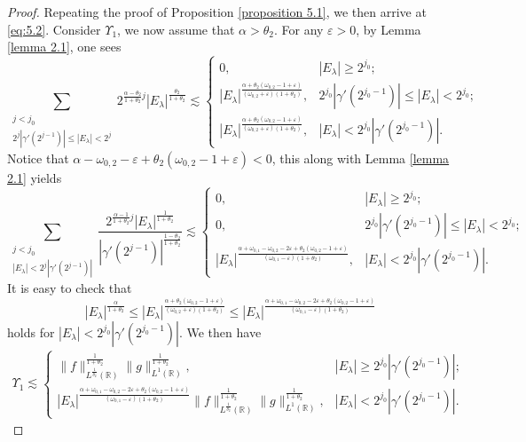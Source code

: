 \documentclass[11pt, twoside, leqno]{article}
\theoremstyle{definition}
\numberwithin{equation}{section}
\begin{document}
\begin{proof}

Repeating the proof of Proposition \ref{proposition 5.1}, we then arrive at \eqref{eq:5.2}. Consider $\Upsilon_{1}$, we now assume that $\alpha>\theta_2$. For any $\varepsilon>0$, by Lemma \ref{lemma 2.1}, one sees
$$\sum\limits_{  \substack{j<j_{0}   \\ 2^j{|\gamma'(2^{j-1})|}\leq|E_{\lambda}|<2^j }} 2^{{\frac{\alpha-\theta_{2}}{1+\theta_{2}}}j}|E_\lambda|^{\frac{\theta_{2}}{1+\theta_{2}}}\lesssim
\begin{cases}
  0, & |E_\lambda|\geq2^{j_0}; \\
  |E_\lambda|^{\frac{\alpha+\theta_2(\omega_{0,2}-1+\varepsilon)}{(\omega_{0,2}+\varepsilon)(1+\theta_{2})}}, & 2^{j_0}|\gamma'(2^{j_{0}-1})|\leq|E_{\lambda}|<2^{j_0};\\
  |E_\lambda|^{\frac{\alpha+\theta_2(\omega_{0,2}-1+\varepsilon)}{(\omega_{0,2}+\varepsilon)(1+\theta_{2})}}, &|E_{\lambda}|<2^{j_0}|\gamma'(2^{j_{0}-1})|.
\end{cases}$$
Notice that $\alpha-\omega_{0,2}-\varepsilon+\theta_2(\omega_{0,2}-1+\varepsilon)<0$, this along with Lemma \ref{lemma 2.1} yields
$$\sum\limits_{  \substack{j<j_{0}   \\ |E_{\lambda}|<2^j|\gamma'(2^{j-1})| }} \frac{2^{{\frac{\alpha-1}{1+\theta_{2}}j}}|E_\lambda|^{\frac{1}{1+\theta_{2}}}}{|\gamma'(2^{j-1})|^{\frac{1-\theta_{2}}{1+\theta_{2}}}}\lesssim
\begin{cases}
  0, & |E_\lambda|\geq2^{j_0}; \\
  0, & 2^{j_0}|\gamma'(2^{j_{0}-1})|\leq|E_{\lambda}|<2^{j_0};\\
  |E_\lambda|^{\frac{\alpha+\omega_{0,1}-\omega_{0,2}-2\varepsilon+\theta_{2}(\omega_{0,2}-1+\varepsilon)}{(\omega_{0,1}-\varepsilon)(1+\theta_{2})}}, &|E_{\lambda}|<2^{j_0}|\gamma'(2^{j_{0}-1})|.
\end{cases}$$
It is easy to check that $$|E_\lambda|^{{\frac{\alpha}{1+\theta_{2}}}}\leq|E_\lambda|^{\frac{\alpha+\theta_2(\omega_{0,2}-1+\varepsilon)}{(\omega_{0,2}+\varepsilon)(1+\theta_{2})}}\leq
|E_\lambda|^{\frac{\alpha+\omega_{0,1}-\omega_{0,2}-2\varepsilon+\theta_{2}(\omega_{0,2}-1+\varepsilon)}{(\omega_{0,1}-\varepsilon)(1+\theta_{2})}}$$
holds for $|E_{\lambda}|<2^{j_0}|\gamma'(2^{j_{0}-1})|$. We then have
\begin{align}\label{eq:5.8}
\Upsilon_1\lesssim
\begin{cases}
  \|f\|^{\frac{1}{1+\theta_2}}_{L^{\frac{1}{\theta_2}}(\mathbb{R})}\|g\|^{\frac{1}{1+\theta_2}}_{L^{1}(\mathbb{R})}, & |E_\lambda|\geq2^{j_0}|\gamma'(2^{j_{0}-1})|;\\
  |E_\lambda|^{\frac{\alpha+\omega_{0,1}-\omega_{0,2}-2\varepsilon+\theta_{2}(\omega_{0,2}-1+\varepsilon)}{(\omega_{0,1}-\varepsilon)(1+\theta_{2})}}
\|f\|^{\frac{1}{1+\theta_2}}_{L^{\frac{1}{\theta_2}}(\mathbb{R})}\|g\|^{\frac{1}{1+\theta_2}}_{L^{1}(\mathbb{R})}, &|E_{\lambda}|<2^{j_0}|\gamma'(2^{j_{0}-1})|.
\end{cases}
 \end{align}


\end{proof}
\end{document}

